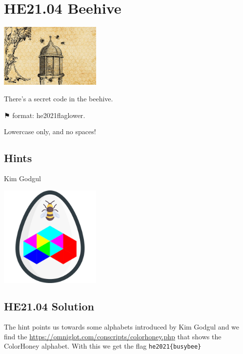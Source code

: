 \documentclass[english,a4paper,nols,noindent]{tufte-handout}
\begin{document}
\hypertarget{he21.04}{%
  \section{HE21.04 Beehive}
  \label{he21.04}}

\begin{marginfigure}
    \includegraphics[width=50mm]{images/challenge4.jpg}
\end{marginfigure}


\noindent There's a secret code in the beehive.

⚑ format: he2021{flaglower}.

Lowercase only, and no spaces!
\subsection{Hints}
Kim Godgul

\begin{marginfigure}
    \includegraphics[width=50mm]{ch04/beehive.png}
\end{marginfigure}


\hypertarget{he21.04-solution}{%
\subsection{HE21.04 Solution}\label{he21.04-solution}}

\noindent The hint points us towards some alphabets introduced by Kim
Godgul and we find the
\url{https://omniglot.com/conscripts/colorhoney.php} that shows the
ColorHoney alphabet.  With this we get the flag \verb+he2021{busybee}+
\end{document}
